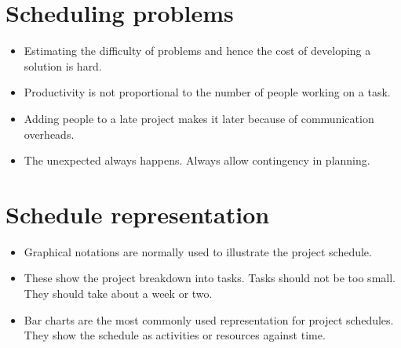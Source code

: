 \section{Scheduling problems}
\begin{itemize}

\item Estimating the difficulty of problems and hence the cost of developing a solution is hard.

\item Productivity is not proportional to the number of people working on a task.

\item Adding people to a late project makes it later because of communication overheads.

\item The unexpected always happens. Always allow contingency in planning.
\end{itemize}
\section{Schedule representation}
\begin{itemize}

\item Graphical notations are normally used to illustrate the project schedule.

\item These show the project breakdown into tasks. Tasks should not be too small. They should take about a week or two.

\item Bar charts are the most commonly used representation for project schedules. They show the schedule as activities or resources against time.
\end{itemize}
